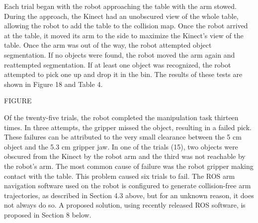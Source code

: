\documentclass[]{cwru} %
\begin{document}
Each trial began with the robot approaching the table with the arm
stowed. During the approach, the Kinect had an unobscured view of the
whole table, allowing the robot to add the table to the collision map.
Once the robot arrived at the table, it moved its arm to the side to
maximize the Kinect's view of the table. Once the arm was out of the
way, the robot attempted object segmentation. If no objects were found,
the robot moved the arm again and reattempted segmentation. If at least
one object was recognized, the robot attempted to pick one up and drop
it in the bin. The results of these tests are shown in Figure 18 and
Table 4.

FIGURE

Of the twenty-five trials, the robot completed the manipulation task
thirteen times. In three attempts, the gripper missed the object,
resulting in a failed pick. These failures can be attributed to the very
small clearance between the 5 cm object and the 5.3 cm gripper jaw. In
one of the trials (15), two objects were obscured from the Kinect by the
robot arm and the third was not reachable by the robot's arm. The most
common cause of failure was the robot gripper making contact with the
table. This problem caused six trials to fail. The ROS arm navigation
software used on the robot is configured to generate collision-free arm
trajectories, as described in Section 4.3 above, but for an unknown
reason, it does not always do so. A proposed solution, using recently
released ROS software, is proposed in Section 8 below.
\end{document}
